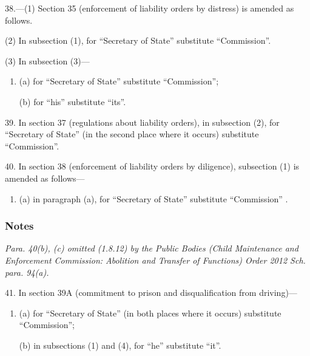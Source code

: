 \documentclass[a4paper]{article}
\newcommand\amendment[1]{\subsubsection*{Notes}{\itshape\frenchspacing\footnotesize #1 \par}}
\begin{document}
\medskip

38.---(1) Section 35 (enforcement of liability orders by distress) is amended as follows.

(2) In subsection (1), for “Secretary of State” substitute “Commission”.

(3) In subsection (3)—
\begin{enumerate}\item[]
(a) for “Secretary of State” substitute “Commission”;

(b) for “his” substitute “its”.
\end{enumerate}

\medskip

39. In section 37 (regulations about liability orders), in subsection (2), for “Secretary of State” (in the second place where it occurs) substitute “Commission”.

\medskip

40. In section 38 (enforcement of liability orders by diligence), subsection (1) is amended as follows—
\begin{enumerate}\item[]
(a) in paragraph (a), for “Secretary of State” substitute “Commission”%
%
%
.
\end{enumerate}

\amendment{
Para. 40(b), (c) omitted (1.8.12) by the Public Bodies (Child Maintenance and Enforcement Commission: Abolition and Transfer of Functions) Order 2012 Sch. para. 94(a).

}

\medskip

41. In section 39A (commitment to prison and disqualification from driving)—
\begin{enumerate}\item[]
(a) for “Secretary of State” (in both places where it occurs) substitute “Commission”;

(b) in subsections (1) and (4), for “he” substitute “it”.
\end{enumerate}
\end{document}
